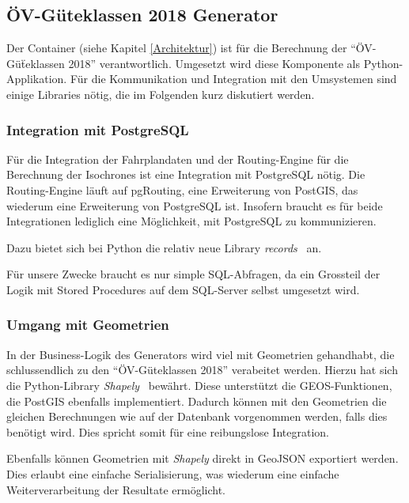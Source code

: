 \subsection{ÖV-Güteklassen 2018 Generator}
\label{Analyse:ÖV-Güteklassen 2018 Generator}

Der Container  (siehe Kapitel \ref{Architektur}) ist für die Berechnung der "`ÖV-Güẗeklassen 2018"' verantwortlich.
Umgesetzt wird diese Komponente als Python-Applikation.
Für die Kommunikation und Integration mit den Umsystemen sind einige Libraries nötig, die im Folgenden kurz diskutiert werden.

\subsubsection{Integration mit PostgreSQL}
\label{analyse_generator:Integration mit PostgreSQL}

Für die Integration der Fahrplandaten und der Routing-Engine für die Berechnung der \glspl{Isochrone} ist eine Integration mit PostgreSQL nötig.
Die Routing-Engine läuft auf pgRouting, eine Erweiterung von PostGIS, das wiederum eine Erweiterung von PostgreSQL ist.
Insofern braucht es für beide Integrationen lediglich eine Möglichkeit, mit PostgreSQL zu kommunizieren.

Dazu bietet sich bei Python die relativ neue Library \emph{records}~\cite{records} an.

Für unsere Zwecke braucht es nur simple SQL-Abfragen, da ein Grossteil der Logik mit \glspl{Stored Procedure} auf dem SQL-Server selbst umgesetzt wird.

\subsubsection{Umgang mit Geometrien}
\label{analyse_generator: Umgang mit Geometrien}

In der Business-Logik des Generators wird viel mit Geometrien gehandhabt, die schlussendlich zu den "`ÖV-Güteklassen 2018"' verabeitet werden.
Hierzu hat sich die Python-Library \emph{Shapely}~\cite{shapely} bewährt.
Diese unterstützt die \gls{GEOS}-Funktionen, die PostGIS ebenfalls implementiert.
Dadurch können mit den Geometrien die gleichen Berechnungen wie auf der Datenbank vorgenommen werden, falls dies benötigt wird.
Dies spricht somit für eine reibungslose Integration.

Ebenfalls können Geometrien mit \emph{Shapely} direkt in \gls{GeoJSON} exportiert werden.
Dies erlaubt eine einfache Serialisierung, was wiederum eine einfache Weiterverarbeitung der Resultate ermöglicht.

